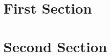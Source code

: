 \documentclass{article}
\begin{document}
\section{First Section}
\section{Second Section}
\end{document}
